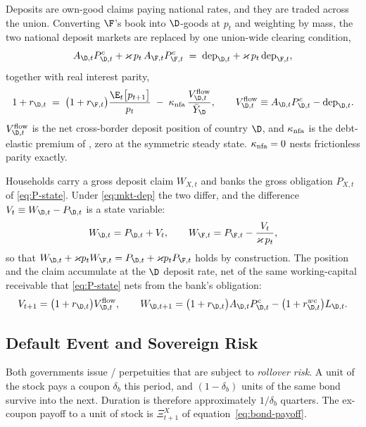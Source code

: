 Deposits are own-good claims paying national rates, and they are traded across the
union. Converting $\F$'s book into $\D$-goods at $p_t$ and weighting by mass, the
two national deposit markets are replaced by one union-wide clearing condition,
\begin{equation}
A_{\D,t}P^{c}_{\D,t}+\varkappa\,p_t\,A_{\F,t}P^{c}_{\F,t}
\;=\;\mathrm{dep}_{\D,t}+\varkappa\,p_t\,\mathrm{dep}_{\F,t},
\label{eq:mkt-dep}
\end{equation}
together with real interest parity,
\begin{equation}
1+r_{\D,t}
\;=\;\bigl(1+r_{\F,t}\bigr)\frac{\E_t\bigl[p_{t+1}\bigr]}{p_t}
\;-\;\kappa_{\rm nfa}\,\frac{V^{\rm flow}_{\D,t}}{\bar Y_\D},
\qquad
V^{\rm flow}_{\D,t}\equiv A_{\D,t}P^{c}_{\D,t}-\mathrm{dep}_{\D,t}.
\label{eq:uip}
\end{equation}
$V^{\rm flow}_{\D,t}$ is the net cross-border deposit position of country $\D$, and
$\kappa_{\rm nfa}$ is the debt-elastic premium of
\citet{schmittgrohe2003closing}, zero at the symmetric steady state.
$\kappa_{\rm nfa}=0$ nests frictionless parity exactly.

Households carry a gross deposit claim $W_{X,t}$ and banks the gross obligation
$P_{X,t}$ of \eqref{eq:P-state}. Under \eqref{eq:mkt-dep} the two differ, and the
difference $V_t\equiv W_{\D,t}-P_{\D,t}$ is a state variable:
\begin{equation}
W_{\D,t}=P_{\D,t}+V_t,
\qquad
W_{\F,t}=P_{\F,t}-\frac{V_t}{\varkappa\,p_t},
\label{eq:union-wealth}
\end{equation}
so that $W_{\D,t}+\varkappa p_t W_{\F,t}=P_{\D,t}+\varkappa p_t P_{\F,t}$ holds by
construction. The position and the claim accumulate at the $\D$ deposit rate, net
of the same working-capital receivable that \eqref{eq:P-state} nets from the
bank's obligation:
\begin{equation}
V_{t+1}=\bigl(1+r_{\D,t}\bigr)V^{\rm flow}_{\D,t},
\qquad
W_{\D,t+1}=\bigl(1+r_{\D,t}\bigr)A_{\D,t}P^{c}_{\D,t}
           -\bigl(1+r^{wc}_{\D,t}\bigr)L_{\D,t}.
\label{eq:V-lom}
\end{equation}

\subsection{Default Event and Sovereign Risk}
\label{sec:default}

Both governments issue \cite{Hatchondo2009}/\cite{Chatterjee2011} perpetuities that are subject to \emph{rollover risk}. A unit of the stock pays a coupon $\delta_{b}$ this period, and $(1-\delta_{b})$ units of the same bond survive into the next. Duration is therefore approximately $1/\delta_{b}$ quarters. The ex-coupon payoff to a unit of stock is $\Xi_{t+1}^X$ of equation~\eqref{eq:bond-payoff}.

